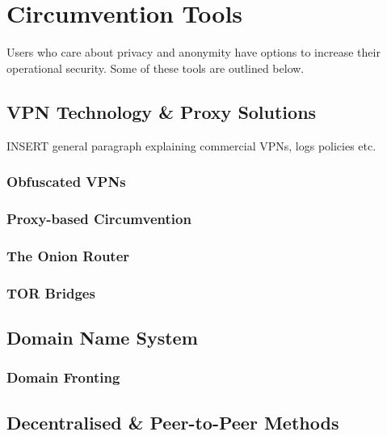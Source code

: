 \chapter{Circumvention Tools}

Users who care about privacy and anonymity have options to increase their operational security. Some of these tools are outlined below.

\section{VPN Technology \& Proxy Solutions}

INSERT general paragraph explaining commercial VPNs, logs policies etc.

\subsection{Obfuscated VPNs}
\subsection{Proxy-based Circumvention}
\subsection{The Onion Router}
\subsection{TOR Bridges}




\section{Domain Name System}

\subsection{Domain Fronting}
\subsection{}
\subsection{}



\section{Decentralised \& Peer-to-Peer Methods}

